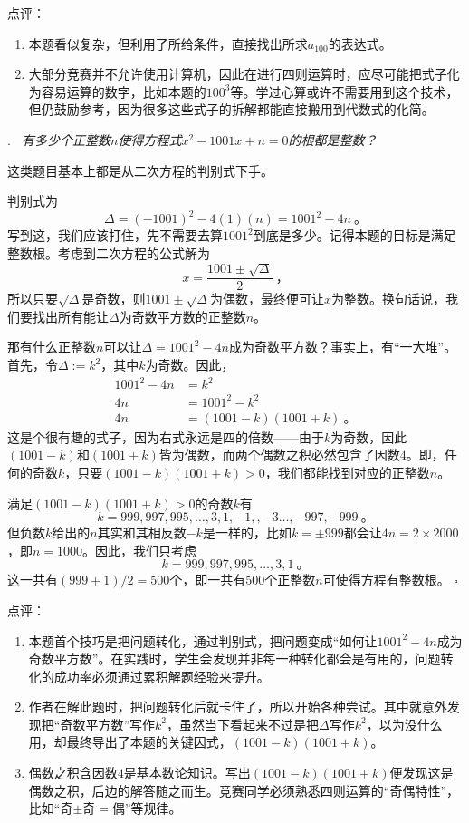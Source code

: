 \documentclass[a4,12pt]{article}
\newcounter{Problem}
\newcommand{\Problem}[1]{
		\vspace*{10pt}
		\stepcounter{Problem}
		\label{Problem \arabic{Problem}}
		\noindent\arabic{Problem}.\emph{~#1}
	}
\newcommand{\Qed}{\hfill\ensuremath{\square}}
\begin{document}
	\noindent 点评：
	\begin{enumerate}[label=(\alph*)]
		\item 本题看似复杂，但利用了所给条件，直接找出所求$a_{100}$的表达式。
		\item 大部分竞赛并不允许使用计算机，因此在进行四则运算时，应尽可能把式子化为容易运算的数字，比如本题的$100^3$等。学过心算或许不需要用到这个技术，但仍鼓励参考，因为很多这些式子的拆解都能直接搬用到代数式的化简。
	\end{enumerate}

\pagebreak
\Problem{
	有多少个正整数$n$使得方程式$x^2-1001x+n=0$的根都是整数？
	}

	这类题目基本上都是从二次方程的判别式下手。

	判别式为
	\[ \Delta = (-1001)^2 - 4(1)(n) = 1001^2 - 4n \ \mbox{。} \]
	写到这，我们应该打住，先不需要去算$1001^2$到底是多少。记得本题的目标是满足整数根。考虑到二次方程的公式解为
	\[ x = \frac{1001\pm\sqrt{\Delta}}{2} \ \mbox{，} \]
	所以只要$\sqrt{\Delta}$是奇数，则$1001\pm\sqrt{\Delta}$为偶数，最终便可让$x$为整数。换句话说，我们要找出所有能让$\Delta$为奇数平方数的正整数$n$。

	那有什么正整数$n$可以让$\Delta=1001^2-4n$成为奇数平方数？事实上，有“一大堆”。首先，令$\Delta:=k^2$，其中$k$为奇数。因此，
	\[ \begin{aligned}
			1001^2 - 4n &= k^2 \\
			4n &= 1001^2 - k^2 \\
			4n &= (1001-k)(1001+k) \ \mbox{。}
		\end{aligned}
	\]
	这是个很有趣的式子，因为右式永远是四的倍数——由于$k$为奇数，因此$(1001-k)$和$(1001+k)$皆为偶数，而两个偶数之积必然包含了因数$4$。即，任何的奇数$k$，只要$(1001-k)(1001+k)>0$，我们都能找到对应的正整数$n$。

	满足$(1001-k)(1001+k)>0$的奇数$k$有
	\[ k=999, 997, 995, \ldots, 3, 1, -1, , -3 \ldots, -997, -999 \ \mbox{。} \]
	但负数$k$给出的$n$其实和其相反数$-k$是一样的，比如$k=\pm999$都会让$4n=2\times2000$，即$n=1000$。因此，我们只考虑
	\[ k = 999, 997, 995, \ldots, 3, 1 \ \mbox{。} \]
	这一共有$(999+1)/2=500$个，即一共有$500$个正整数$n$可使得方程有整数根。
	\Qed
	\vspace*{30pt}

	\noindent 点评：
	\begin{enumerate}[label=(\alph*)]
		\item 本题首个技巧是把问题转化，通过判别式，把问题变成“如何让$1001^2-4n$成为奇数平方数”。在实践时，学生会发现并非每一种转化都会是有用的，问题转化的成功率必须通过累积解题经验来提升。
		\item 作者在解此题时，把问题转化后就卡住了，所以开始各种尝试。其中就意外发现把“奇数平方数”写作$k^2$，虽然当下看起来不过是把$\Delta$写作$k^2$，以为没什么用，却最终导出了本题的关键因式，$(1001-k)(1001+k)$。
		\item 偶数之积含因数$4$是基本数论知识。写出$(1001-k)(1001+k)$便发现这是偶数之积，后边的解答随之而生。竞赛同学必须熟悉四则运算的“奇偶特性”，比如“奇$\pm$奇$=$偶”等规律。
	\end{enumerate}
\end{document}
